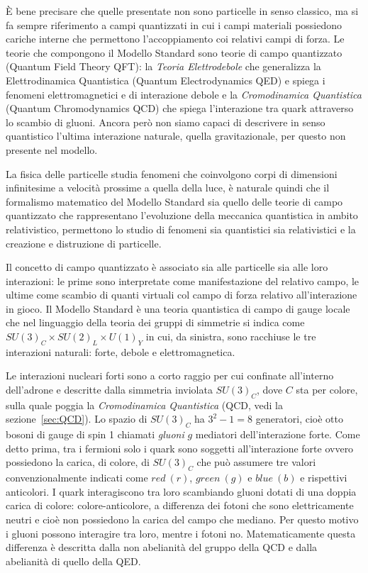     È bene precisare che quelle presentate non sono particelle in senso classico, ma si fa sempre riferimento a campi quantizzati in cui i campi materiali possiedono cariche interne che permettono l'accoppiamento coi relativi campi di forza. Le teorie che compongono il Modello Standard sono teorie di campo quantizzato (Quantum Field Theory QFT): la \textit{Teoria Elettrodebole} che generalizza la Elettrodinamica Quantistica (Quantum Electrodynamics QED) e spiega i fenomeni elettromagnetici e di interazione debole e la \textit{Cromodinamica Quantistica} (Quantum Chromodynamics QCD) che spiega l'interazione tra quark attraverso lo scambio di gluoni. Ancora però non siamo capaci di descrivere in senso quantistico l'ultima interazione naturale, quella gravitazionale, per questo non presente nel modello.

    La fisica delle particelle studia fenomeni che coinvolgono corpi di dimensioni infinitesime a velocità prossime a quella della luce, è naturale quindi che il formalismo matematico del Modello Standard sia quello delle teorie di campo quantizzato che rappresentano l'evoluzione della meccanica quantistica in ambito relativistico, permettono lo studio di fenomeni sia quantistici sia relativistici e la creazione e distruzione di particelle.
    
    Il concetto di campo quantizzato è associato sia alle particelle sia alle loro interazioni: le prime sono interpretate come manifestazione del relativo campo, le ultime come scambio di quanti virtuali col campo di forza relativo all'interazione in gioco. Il Modello Standard è una teoria quantistica di campo di gauge locale che nel linguaggio della teoria dei gruppi di simmetrie si indica come $SU(3)_C \times SU(2)_L \times U(1)_Y$ in cui, da sinistra, sono racchiuse le tre interazioni naturali: forte, debole e elettromagnetica.

    Le interazioni nucleari forti sono a corto raggio per cui confinate all'interno dell'adrone e descritte dalla simmetria inviolata $SU(3)_C$, dove $C$ sta per colore, sulla quale poggia la \textit{Cromodinamica Quantistica} (QCD, vedi la sezione~\ref{sec:QCD}). Lo spazio di $SU(3)_C$ ha $3^2 - 1 = 8$ generatori, cioè otto bosoni di gauge di spin 1 chiamati \textit{gluoni} $g$ mediatori dell'interazione forte. Come detto prima, tra i fermioni solo i quark sono soggetti all'interazione forte ovvero possiedono la carica, di colore, di $SU(3)_C$ che può assumere tre valori convenzionalmente indicati come $red\ (r)$, $green\ (g)$ e $blue\ (b)$ e rispettivi anticolori. I quark interagiscono tra loro scambiando gluoni dotati di una doppia carica di colore: colore-anticolore, a differenza dei fotoni che sono elettricamente neutri e cioè non possiedono la carica del campo che mediano. Per questo motivo i gluoni possono interagire tra loro, mentre i fotoni no. Matematicamente questa differenza è descritta dalla non abelianità del gruppo della QCD e dalla abelianità di quello della QED.

